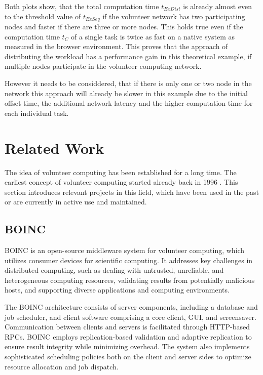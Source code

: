 Both plots show, that the total computation time $t_{ExDist}$ is already almost even to the threshold value of $t_{ExSeq}$ if the volunteer network has two participating nodes and faster if there are three or more nodes. This holds true even if the computation time $t_{C}$ of a single task is twice as fast on a native system as measured in the browser environment. This proves that the approach of distributing the workload has a performance gain in this theoretical example, if multiple nodes participate in the volunteer computing network. 

However it needs to be considdered, that if there is only one or two node in the network this approach will already be slower in this example due to the initial offset time, the additional network latency and the higher computation time for each individual task.

\section{Related Work}
\label{sec:background:related_work}
The idea of volunteer computing has been established for a long time. The earliest concept of volunteer computing started already back in 1996 \cite{relatedwork:boinc1}. This section introduces relevant projects in this field, which have been used in the past or are currently in active use and maintained.

\subsection{BOINC}
\label{subsec:background:related_work:boinc}
\ac{BOINC} is an open-source middleware system for volunteer computing, which utilizes consumer devices for scientific computing. It addresses key challenges in distributed computing, such as dealing with untrusted, unreliable, and heterogeneous computing resources, validating results from potentially malicious hosts, and supporting diverse applications and computing environments. \cite{relatedwork:boinc1}

The BOINC architecture consists of server components, including a database and job scheduler, and client software comprising a core client, GUI, and screensaver. Communication between clients and servers is facilitated through HTTP-based RPCs. BOINC employs replication-based validation and adaptive replication to ensure result integrity while minimizing overhead. The system also implements sophisticated scheduling policies both on the client and server sides to optimize resource allocation and job dispatch. \cite{relatedwork:boinc1}

